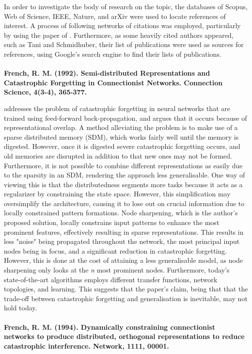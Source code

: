 In order to investigate the body of research on the topic, the databases of Scopus, Web of Science, IEEE, Nature, and arXiv were used to locate references of interest. A process of following networks of citations was employed, particularly by using the paper of \cite{McClelland1995}. Furthermore, as some heavily cited authors appeared, such as Tani and Schmidhuber, their list of publications were used as sources for references, using Google's search engine to find their lists of publications.
\\
\\
\textbf{French, R. M. (1992). Semi-distributed Representations and Catastrophic Forgetting in Connectionist Networks. Connection Science, 4(3-4), 365-377.}

\cite{French1992} addresses the problem of catastrophic forgetting \cite{McCloskey1989, Ratcliff1990} in neural networks that are trained using feed-forward back-propagation, and argues that it occurs because of representational overlap. A method alleviating the problem is to make use of a sparse distributed memory (SDM), which works fairly well until the memory is digested. However, once it is digested severe catastrophic forgetting occurs, and old memories are disrupted in addition to that new ones may not be formed. Furthermore, it is not possible to combine different representations as easily due to the sparsity in an SDM, rendering the approach less generalisable. One way of viewing this is that the distributedness segments more tasks because it acts as a regularizer by constraining the state space. However, this simplification may oversimplify the architecture, causing it to lose out on crucial information due to locally constrained pattern formations. Node sharpening, which is the author's proposed solution, locally constrains input patterns to enhance the most prominent features, effectively resulting in sparse representations. This results in less "noise" being propagated throughout the network, the most principal input nodes being in focus, and a significant reduction in catastrophic forgetting. However, this is done at the cost of attaining a less generalisable model, as node sharpening only looks at the \textit{n} most prominent nodes. Furthermore, today's state-of-the-art algorithms employs different transfer functions, network topologies, and learning. This suggests that the paper's claim, being that that the trade-off between catastrophic forgetting and generalisation is inevitable, may not hold today.
\\
\\
\textbf{French, R. M. (1994). Dynamically constraining connectionist networks to produce distributed, orthogonal representations to reduce catastrophic interference. Network, 1111, 00001.}


